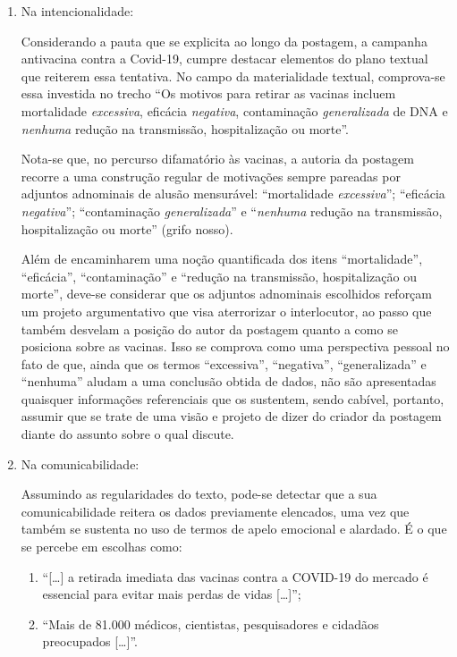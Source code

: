\documentclass[portuguese]{textolivre}
\begin{document}
\begin{enumerate}
\item Na intencionalidade:

Considerando a pauta que se explicita ao longo da postagem, a campanha antivacina contra a Covid-19, cumpre destacar elementos do plano textual que reiterem essa tentativa. No campo da materialidade textual, comprova-se essa investida no trecho “Os motivos para retirar as vacinas incluem mortalidade \textit{excessiva}, eficácia \textit{negativa}, contaminação \textit{generalizada} de DNA e \textit{nenhuma} redução na transmissão, hospitalização ou morte”.

Nota-se que, no percurso difamatório às vacinas, a autoria da postagem recorre a uma construção regular de motivações sempre pareadas por adjuntos adnominais de alusão mensurável: “mortalidade \textit{excessiva}”; “eficácia \textit{negativa}”; “contaminação \textit{generalizada}” e “\textit{nenhuma} redução na transmissão, hospitalização ou morte” (grifo nosso).

Além de encaminharem uma noção quantificada dos itens “mortalidade”, “eficácia”, “contaminação” e “redução na transmissão, hospitalização ou morte”, deve-se considerar que os adjuntos adnominais escolhidos reforçam um projeto argumentativo que visa aterrorizar o interlocutor, ao passo que também desvelam a posição do autor da postagem quanto a como se posiciona sobre as vacinas. Isso se comprova como uma perspectiva pessoal no fato de que, ainda que os termos “excessiva”, “negativa”, “generalizada” e “nenhuma” aludam a uma conclusão obtida de dados, não são apresentadas quaisquer informações referenciais que os sustentem, sendo cabível, portanto, assumir que se trate de uma visão e projeto de dizer do criador da postagem diante do assunto sobre o qual discute.

\item Na comunicabilidade:

Assumindo as regularidades do texto, pode-se detectar que a sua comunicabilidade reitera os dados previamente elencados, uma vez que também se sustenta no uso de termos de apelo emocional e alardado. É o que se percebe em escolhas como:

\begin{enumerate}
    \item “[…] a retirada imediata das vacinas contra a COVID-19 do mercado é essencial para evitar mais perdas de vidas […]”;
    \item “Mais de 81.000 médicos, cientistas, pesquisadores e cidadãos preocupados […]”.
\end{enumerate}


\end{enumerate}
\end{document}
